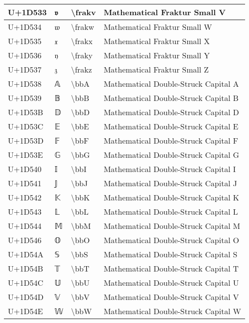 \begin{table}[h]
\begin{tabulary}{\linewidth}{|L|L|L|L|}
\hline
U+1D533 & 𝔳 & {\textbackslash}frakv & Mathematical Fraktur Small V \\
\hline
U+1D534 & 𝔴 & {\textbackslash}frakw & Mathematical Fraktur Small W \\
\hline
U+1D535 & 𝔵 & {\textbackslash}frakx & Mathematical Fraktur Small X \\
\hline
U+1D536 & 𝔶 & {\textbackslash}fraky & Mathematical Fraktur Small Y \\
\hline
U+1D537 & 𝔷 & {\textbackslash}frakz & Mathematical Fraktur Small Z \\
\hline
U+1D538 & 𝔸 & {\textbackslash}bbA & Mathematical Double-Struck Capital A \\
\hline
U+1D539 & 𝔹 & {\textbackslash}bbB & Mathematical Double-Struck Capital B \\
\hline
U+1D53B & 𝔻 & {\textbackslash}bbD & Mathematical Double-Struck Capital D \\
\hline
U+1D53C & 𝔼 & {\textbackslash}bbE & Mathematical Double-Struck Capital E \\
\hline
U+1D53D & 𝔽 & {\textbackslash}bbF & Mathematical Double-Struck Capital F \\
\hline
U+1D53E & 𝔾 & {\textbackslash}bbG & Mathematical Double-Struck Capital G \\
\hline
U+1D540 & 𝕀 & {\textbackslash}bbI & Mathematical Double-Struck Capital I \\
\hline
U+1D541 & 𝕁 & {\textbackslash}bbJ & Mathematical Double-Struck Capital J \\
\hline
U+1D542 & 𝕂 & {\textbackslash}bbK & Mathematical Double-Struck Capital K \\
\hline
U+1D543 & 𝕃 & {\textbackslash}bbL & Mathematical Double-Struck Capital L \\
\hline
U+1D544 & 𝕄 & {\textbackslash}bbM & Mathematical Double-Struck Capital M \\
\hline
U+1D546 & 𝕆 & {\textbackslash}bbO & Mathematical Double-Struck Capital O \\
\hline
U+1D54A & 𝕊 & {\textbackslash}bbS & Mathematical Double-Struck Capital S \\
\hline
U+1D54B & 𝕋 & {\textbackslash}bbT & Mathematical Double-Struck Capital T \\
\hline
U+1D54C & 𝕌 & {\textbackslash}bbU & Mathematical Double-Struck Capital U \\
\hline
U+1D54D & 𝕍 & {\textbackslash}bbV & Mathematical Double-Struck Capital V \\
\hline
U+1D54E & 𝕎 & {\textbackslash}bbW & Mathematical Double-Struck Capital W \\

\end{tabulary}
\end{table}
